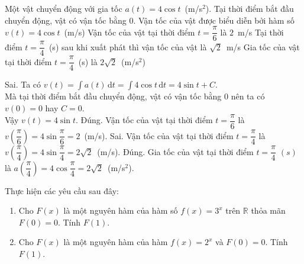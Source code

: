 \begin{ex}%
Một vật chuyển động với gia tốc $ a(t)=4\cos t$~(m/s$^2$). Tại thời điểm bắt đầu chuyển động, vật có vận tốc bằng $0$.
\choiceTF
{Vận tốc của vật được biểu diễn bởi hàm số $v(t)=4\cos t$~(m/s)}
{\True Vận tốc của vật tại thời điểm $ t=\dfrac{\pi}{6}$ là $2$~m/s}
{Tại thời điểm $ t=\dfrac{\pi}{4}$~(s) sau khi xuất phát thì vận tốc của vật là $\sqrt{2}$~m/s}
{\True Gia tốc của vật tại thời điểm $ t=\dfrac{\pi}{4}$~(s) là $2\sqrt{2}$~(m/s$^2$)}
\loigiai
{
	\begin{itemchoice}
	\itemch Sai. Ta có $ v(t)=\displaystyle\int a(t)\mathrm{\,d}t=\displaystyle\int 4\cos t\mathrm{\,d}t=4\sin t+C$.\\
	Mà tại thời điểm bắt đầu chuyển động, vật có vận tốc bằng $0$ nên ta có $v(0)=0$ hay $C=0$.\\
	Vậy $v(t)=4\sin t$.
	\itemch Đúng. Vận tốc của vật tại thời điểm $t=\dfrac{\pi}{6}$ là $ v\left(\dfrac{\pi}{6}\right)=4\sin \dfrac{\pi}{6}=2$~(m/s).
	\itemch Sai. Vận tốc của vật tại thời điểm $ t=\dfrac{\pi}{4}$ là $ v\left(\dfrac{\pi}{4}\right)=4\sin \dfrac{\pi}{4}=2\sqrt{2}$~(m/s).
	\itemch Đúng. Gia tốc của vật tại thời điểm $t=\dfrac{\pi}{4}$ $(s)$ là $ a\left(\dfrac{\pi}{4}\right)=4\cos \dfrac{\pi}{4}=2\sqrt{2}$~(m/s$^2$).
	\end{itemchoice}
}
\end{ex}

\begin{bt}%
	Thực hiện các yêu cầu sau  đây:
	\begin{enumerate}
		\item Cho $F(x)$ là một nguyên hàm của hàm số $  f(x)={3^x}$ trên $\mathbb{R}$ thỏa mãn $F(0)=0$. Tính $F(1)$.
		\item Cho $F(x)$  là một nguyên hàm của hàm $ f(x)={2^x}$ và $F(0)=0$. Tính $F(1)$.
	\end{enumerate}
\end{bt}

